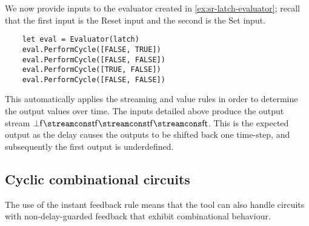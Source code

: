 \begin{example}
  We now provide inputs to the evaluator created in
  \cref{ex:sr-latch-evaluator}; recall that the first input is the
  \textsf{R}eset input and the second is the \textsf{S}et input.
  \begin{lstlisting}
    let eval = Evaluator(latch)
    eval.PerformCycle([FALSE, TRUE])
    eval.PerformCycle([FALSE, FALSE])
    eval.PerformCycle([TRUE, FALSE])
    eval.PerformCycle([FALSE, FALSE])
  \end{lstlisting}
  This automatically applies the streaming and value rules in order to
  determine the output values over time.
  The inputs detailed above produce the output stream \(
  \bot\mathsf{f} \streamcons \mathsf{t}\mathsf{f} \streamcons
  \mathsf{t}\mathsf{f} \streamcons \mathsf{f}\mathsf{t}
  \).
  This is the expected output as the delay causes the outputs to be shifted back
  one time-step, and subsequently the first output is underdefined.
  \begin{center}
    
  \end{center}
\end{example}

\subsection{Cyclic combinational circuits}

The use of the instant feedback rule means that the tool can also handle
circuits with non-delay-guarded feedback that exhibit combinational behaviour.

